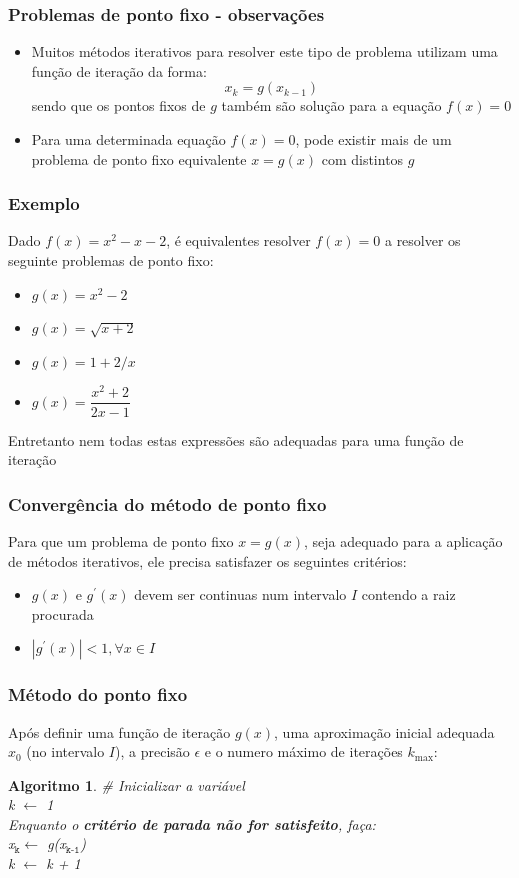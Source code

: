 \documentclass{beamer}
\theoremstyle{mystyle}
\newtheorem{algoritmo}[theorem]{Algoritmo}
\begin{document}
\begin{frame}
	\frametitle{Problemas de ponto fixo - observações}
	\begin{itemize}
		\item Muitos métodos iterativos para resolver este tipo de problema utilizam uma função de iteração da forma:
		\begin{equation*}
			x_{k} = g(x_{k-1})
		\end{equation*}
		sendo que os pontos fixos de $ g $ também são solução para a equação $ f (x) = 0 $		 
		\item Para uma determinada equação $ f (x) = 0 $, pode existir mais de um problema de ponto fixo equivalente $ x = g(x) $ com distintos $ g $
	\end{itemize} 
\end{frame}

\begin{frame}
	\frametitle{Exemplo}
	Dado $ f (x) = x^{2} - x - 2 $, é equivalentes resolver $ f (x) = 0 $ a resolver os seguinte problemas de ponto fixo:
	\begin{itemize}
		\item $g(x) = x^{2} - 2 $
		\item $g(x) = \sqrt{x + 2} $
		\item $g(x) = 1 + 2/x $
		\item $g(x) = \dfrac{x^{2} + 2}{2x - 1} $		
	\end{itemize}
	\pause
	\alert{Entretanto nem todas estas expressões são adequadas para uma função de iteração}
\end{frame}

\begin{frame}
	\frametitle{Convergência do método de ponto fixo}
	Para que um problema de ponto fixo $ x = g(x) $, seja adequado para a aplicação de métodos iterativos, ele precisa satisfazer os seguintes critérios: 
	\begin{itemize}
		\item $ g(x) $ e $ g^{\prime}(x) $ devem ser continuas num intervalo $ I $ contendo a raiz procurada
		\item $ |g^{\prime}(x)| < 1, \forall x \in I $
	\end{itemize} 
\end{frame}

\begin{frame}
	\frametitle{Método do ponto fixo}
	Após definir uma função de iteração $ g(x) $, uma aproximação inicial adequada $ x_{0} $ (no intervalo $ I $), a precisão $ \epsilon $ e o numero máximo de iterações $ k_{\text{max}} $:
	\begin{algoritmo}
		\# Inicializar a variável\\
		 k $\leftarrow$ 1\\ 
		Enquanto o \textbf{critério de parada não for satisfeito}, faça:\\
		\quad x$ _{\texttt{k}} \leftarrow $ g(x$ _{\texttt{k-1}}$) \\
		\quad k $\leftarrow$ k + 1
	\end{algoritmo}
\end{frame}
\end{document}
